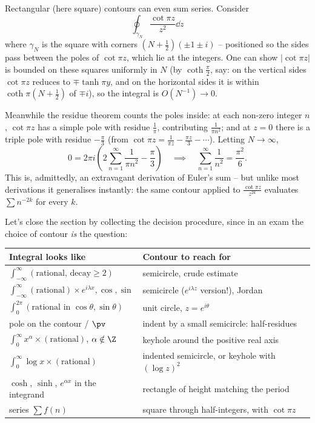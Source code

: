 \begin{example}
	Rectangular (here square) contours can even sum series. Consider
	$$
	\oint_{\gamma_N} \frac{\cot \pi z}{z^2} \dd z
	$$
	where $\gamma_N$ is the square with corners $\left(N + \frac 12\right)(\pm 1 \pm i)$ -- positioned so the sides pass between the poles of $\cot \pi z$, which lie at the integers. One can show $|\cot \pi z|$ is bounded on these squares uniformly in $N$ (by $\coth \frac{\pi}{2}$, say: on the vertical sides $\cot \pi z$ reduces to $\mp\tanh \pi y$, and on the horizontal sides it is within $\coth\pi(N + \frac 12)$ of $\mp i$), so the integral is $O(N^{-1}) \to 0$.

	Meanwhile the residue theorem counts the poles inside: at each non-zero integer $n$, $\cot \pi z$ has a simple pole with residue $\frac{1}{\pi}$, contributing $\frac{1}{\pi n^2}$; and at $z = 0$ there is a triple pole with residue $-\frac{\pi}{3}$ (from $\cot \pi z = \frac{1}{\pi z} - \frac{\pi z}{3} - \cdots$). Letting $N \to \infty$,
	$$
	0 = 2\pi i \left( 2\sum_{n = 1}^\infty \frac{1}{\pi n^2} - \frac \pi 3\right)
	\quad\implies\quad
	\sum_{n=1}^\infty \frac{1}{n^2} = \frac{\pi^2}{6}.
	$$
	This is, admittedly, an extravagant derivation of Euler's sum -- but unlike most derivations it generalises instantly: the same contour applied to $\frac{\cot \pi z}{z^{2k}}$ evaluates $\sum n^{-2k}$ for every $k$.
\end{example}

Let's close the section by collecting the decision procedure, since in an exam the choice of contour \emph{is} the question:

\begin{center}
\begin{tabular}{l|l}
	\textbf{Integral looks like} & \textbf{Contour to reach for} \\
	\hline
	$\int_{-\infty}^\infty (\text{rational, decay} \geq 2)$ & semicircle, crude estimate \\
	$\int_{-\infty}^\infty (\text{rational}) \times e^{i\lambda x}, \cos, \sin$ & semicircle ($e^{i\lambda z}$ version!), Jordan \\
	$\int_0^{2\pi} (\text{rational in } \cos\theta, \sin\theta)$ & unit circle, $z = e^{i\theta}$ \\
	pole on the contour / $\pv$ & indent by a small semicircle: half-residues \\
	$\int_0^\infty x^\alpha \times (\text{rational})$, $\alpha \notin \Z$ & keyhole around the positive real axis \\
	$\int_0^\infty \log x \times (\text{rational})$ & indented semicircle, or keyhole with $(\log z)^2$ \\
	$\cosh$, $\sinh$, $e^{\alpha x}$ in the integrand & rectangle of height matching the period \\
	series $\sum f(n)$ & square through half-integers, with $\cot \pi z$ \\
\end{tabular}
\end{center}

